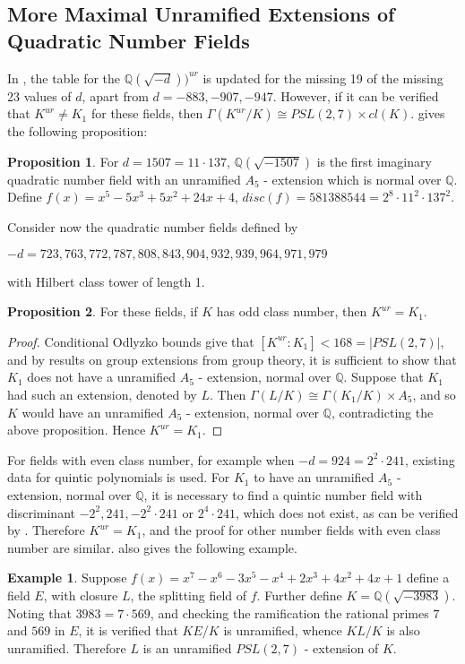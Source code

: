 \documentclass[12pt]{extarticle}
\newcommand{\Q}{\mathbb{Q}}
\newcommand{\<}{\langle}
\renewcommand{\>}{\rangle}
\theoremstyle{definition}
\newtheorem{proposition}{Proposition}
\newtheorem*{example}{Example}
\begin{document}
\subsection{More Maximal Unramified Extensions of Quadratic Number Fields}
In \cite{YAMA2001}, the table for the $\Q(\sqrt{-d}))^{ur}$ is updated for the missing 19 of the missing 23 values of $d$, apart from $d= -883,-907,-947$. However, if it can be verified that $K^{ur} \neq K_1$ for these fields, then $\Gamma(K^{ur}/K) \cong PSL(2,7) \times cl(K)$. 
\cite{YAMA1997} gives the following proposition: \begin{proposition}
For $d=1507 = 11 \cdot 137$, $\Q(\sqrt{-1507})$ is the first imaginary quadratic number field with an unramified $A_5$ - extension which is normal over $\Q$.
Define $f(x) = x^5 -5x^3 + 5x^2 + 24x + 4$, $disc(f) = 581388544 = 2^8 \cdot 11^2 \cdot 137^2$. 
\end{proposition}
Consider now the quadratic number fields defined by \\
\begin{center}
$-d = 723, 763, 772, 787, 808, 843, 904, 932, 939, 964, 971, 979$
\end{center}
 with Hilbert class tower of length 1. 
\begin{proposition}
For these fields, if $K$ has odd class number, then $K^{ur} = K_1$. 
\end{proposition}
\begin{proof}
 Conditional Odlyzko bounds give that $[K^{ur}:K_1]<168 = |PSL(2,7)|$, and by results on group extensions from group theory, it is sufficient to show that $K_1$ does not have a unramified $A_5$ - extension, normal over $\Q$. Suppose that $K_1$ had such an extension, denoted by $L$. Then $\Gamma(L/K) \cong \Gamma(K_1/K) \times A_5$, and so $K$ would have an unramified $A_5$ - extension, normal over $\Q$, contradicting the above proposition. Hence $K^{ur} = K_1$. 

\end{proof}
For fields with even class number, for example when $-d = 924 = 2^2 \cdot 241$, existing data for quintic polynomials is used. For $K_1$ to have an unramified $A_5$ - extension, normal over $\Q$, it is necessary to find a quintic number field with discriminant $-2^2,241,-2^2 \cdot 241$ or $2^4 \cdot 241$, which does not exist, as can be verified by \cite{JONE2}. Therefore $K^{ur} = K_1$, and the proof for other number fields with even class number are similar. 
\cite{YAMA2001} also gives the following example. 
\begin{example}
Suppose $f(x) = x^7 - x^6 - 3x^5 - x^4 + 2x^3 + 4x^2 + 4x + 1$ define a field $E$, with closure $L$, the splitting field of $f$. Further define $K=\Q(\sqrt{-3983})$. Noting that $3983 = 7 \cdot 569$, and checking the ramification the rational primes $7$ and $569$ in $E$, it is verified that $KE/K$ is unramified, whence $KL/K$ is also unramified. Therefore $L$ is an unramified $PSL(2,7)$ - extension of $K$. 
\end{example}
\end{document}
